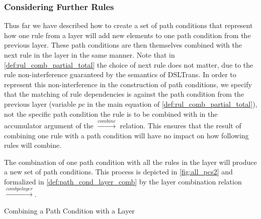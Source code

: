 \subsubsection{Considering Further Rules}
\label{sec:further_rules}
Thus far we have described how to create a set of path conditions that represent how one rule from a layer will add new elements to one path condition from the previous layer. These path conditions are then themselves combined with the next rule in the layer in the same manner. Note that in \cref{def:rul_comb_partial_total} the choice of next rule does not matter, due to the rule non-interference guaranteed by the semantics of DSLTrans. In order to represent this non-interference in the construction of path conditions, we specify that the matching of rule dependencies is against the path condition from the previous layer (variable $pc$ in the main equation of \cref{def:rul_comb_partial_total}), not the specific path condition the rule is to be combined with in the accumulator argument of the $\stackrel{combine}{\rightarrow}$ relation. This ensures that the result of combining one rule with a path condition will have no impact on how following rules will combine.


The combination of one path condition with all the rules in the layer will produce a new set of path conditions. This process is depicted in \cref{fig:all_pcs2} and formalized in \cref{def:path_cond_layer_comb} by the layer combination relation $\stackrel{combpclayer}{\rightarrow}$.

\begin{definition} {Combining a Path Condition with a Layer\\}
\label{def:path_cond_layer_comb}
\end{definition}


